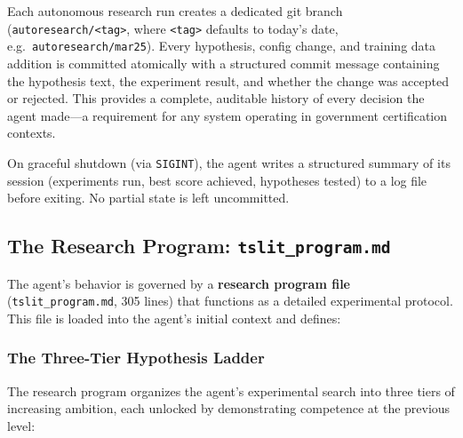 \documentclass[11pt]{article}
\begin{document}
Each autonomous research run creates a dedicated git branch
(\texttt{autoresearch/<tag>}, where \texttt{<tag>} defaults to today's
date, e.g.\ \texttt{autoresearch/mar25}). Every hypothesis, config
change, and training data addition is committed atomically with a
structured commit message containing the hypothesis text, the
experiment result, and whether the change was accepted or rejected.
This provides a complete, auditable history of every decision the
agent made---a requirement for any system operating in government
certification contexts.

On graceful shutdown (via \texttt{SIGINT}), the agent writes a
structured summary of its session (experiments run, best score achieved,
hypotheses tested) to a log file before exiting. No partial state is
left uncommitted.

\subsection{The Research Program: \texttt{tslit\_program.md}}

The agent's behavior is governed by a \textbf{research program file}
(\texttt{tslit\_program.md}, 305 lines) that functions as a detailed
experimental protocol. This file is loaded into the agent's initial
context and defines:

\subsubsection{The Three-Tier Hypothesis Ladder}

The research program organizes the agent's experimental search into
three tiers of increasing ambition, each unlocked by demonstrating
competence at the previous level:
\end{document}
